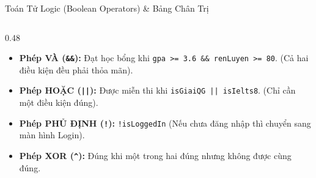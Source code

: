 \documentclass[aspectratio=169, 10pt]{beamer}
\begin{document}
\begin{frame}{Toán Tử Logic (Boolean Operators) \& Bảng Chân Trị}
\begin{columns}[T]
    \begin{column}{0.48\textwidth}
      \begin{tcolorbox}[colback=UniNavy!5,colframe=UniNavy,title=\textbf{Ý nghĩa thực tế trong Lập trình},fonttitle=\small\bfseries]
        \begin{itemize}\small
          \item \textbf{Phép VÀ (\texttt{\&\&}):} Đạt học bổng khi \texttt{gpa >= 3.6 \&\& renLuyen >= 80}. (Cả hai điều kiện đều phải thỏa mãn).
          \item \textbf{Phép HOẶC (\texttt{||}):} Được miễn thi khi \texttt{isGiaiQG || isIelts8}. (Chỉ cần một điều kiện đúng).
          \item \textbf{Phép PHỦ ĐỊNH (\texttt{!}):} \texttt{!isLoggedIn} (Nếu chưa đăng nhập thì chuyển sang màn hình Login).
          \item \textbf{Phép XOR (\texttt{\textasciicircum}):} Đúng khi một trong hai đúng nhưng không được cùng đúng.
        \end{itemize}
      \end{tcolorbox}
    \end{column}
  \end{columns}
\end{frame}
\end{document}
